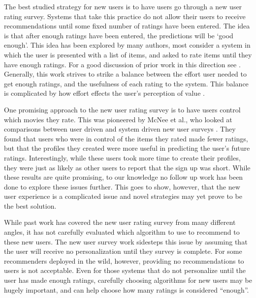 \documentclass[letterpaper]{sig-alternate}
\begin{document}
  The best studied strategy for new users is to have users go through a new user rating survey.
  Systems that take this practice do not allow their users to receive recommendations until some fixed number of ratings have been entered.
  The idea is that after enough ratings have been entered, the predictions will be `good enough'.
  This idea has been explored by many authors, most consider a system in which the user is presented with a list of items, and asked to rate items until they have enough ratings.
  For a good discussion of prior work in this direction see \cite{adaptiveBootstrapping}.
  Generally, this work strives to strike a balance between the effort user needed to get enough ratings, and the usefulness of each rating to the system.
  This balance is complicated by how effort effects the user's perception of value \cite{TenIsEnough}.

  One promising approach to the new user rating survey is to have users control which movies they rate.
  This was pioneered by McNee et al., who looked at comparisons between user driven and system driven new user surveys \cite{mcneeInterfaces}.
  They found that users who were in control of the items they rated made fewer ratings, but that the profiles they created were more useful in predicting the user's future ratings.
  Interestingly, while these users took more time to create their profiles, they were just as likely as other users to report that the sign up was short.
  While these results are quite promising, to our knowledge no follow up work has been done to explore these issues further.
  This goes to show, however, that the new user experience is a complicated issue and novel strategies may yet prove to be the best solution.


  While past work has covered the new user rating survey from many different angles, it has not carefully evaluated which algorithm to use to recommend to these new users.
  The new user survey work sidesteps this issue by assuming that the user will receive no personalization until they survey is complete.
  For some recommenders deployed in the wild, however, providing no recommendations to users is not acceptable.
  Even for those systems that do not personalize until the user has made enough ratings, carefully choosing algorithms for new users may be hugely important, and can help choose how many ratings is considered ``enough''.
  
\end{document}
